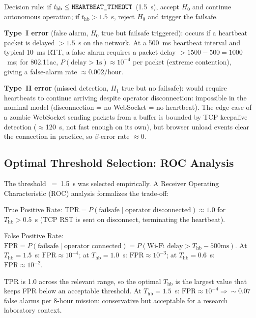 \begin{eqblock}
Decision rule: if $t_{\text{hb}}\leq\code{HEARTBEAT\_TIMEOUT}$ (1.5~s), accept $H_0$ and continue autonomous operation; if $t_{\text{hb}}>1.5$~s, reject $H_0$ and trigger the failsafe.

\textbf{Type~I error} (false alarm, $H_0$ true but failsafe triggered): occurs if a heartbeat packet is delayed $>1.5$~s on the network. At a 500~ms heartbeat interval and typical 10~ms RTT, a false alarm requires a packet delay $>1500-500=1000$~ms; for 802.11ac, $P(\text{delay}>1\text{s})\approx10^{-4}$ per packet (extreme contention), giving a false-alarm rate $\approx0.002$/hour.

\textbf{Type~II error} (missed detection, $H_1$ true but no failsafe): would require heartbeats to continue arriving despite operator disconnection: impossible in the nominal model (disconnection = no WebSocket = no heartbeat). The edge case of a zombie WebSocket sending packets from a buffer is bounded by TCP keepalive detection ($\approx$120~s, not fast enough on its own), but browser unload events clear the connection in practice, so $\beta$-error rate $\approx0$.
\end{eqblock}

\subsection{Optimal Threshold Selection: ROC Analysis}

The threshold ~=~1.5~s was selected empirically. A Receiver Operating Characteristic (ROC) analysis formalizes the trade-off:

\begin{eqblock}
True Positive Rate: $\text{TPR} = P(\text{failsafe}\mid\text{operator disconnected}) \approx 1.0$ for $T_{\text{hb}}>0.5$~s (TCP RST is sent on disconnect, terminating the heartbeat).

False Positive Rate: $\text{FPR} = P(\text{failsafe}\mid\text{operator connected}) = P(\text{Wi-Fi delay}>T_{\text{hb}}-500\text{ms})$. At $T_{\text{hb}}=1.5$~s: $\text{FPR}\approx10^{-4}$; at $T_{\text{hb}}=1.0$~s: $\text{FPR}\approx10^{-3}$; at $T_{\text{hb}}=0.6$~s: $\text{FPR}\approx10^{-2}$.

TPR is 1.0 across the relevant range, so the optimal $T_{\text{hb}}$ is the largest value that keeps FPR below an acceptable threshold. At $T_{\text{hb}}=1.5$~s: $\text{FPR}\approx10^{-4}\Rightarrow\sim$0.07 false alarms per 8-hour mission: conservative but acceptable for a research laboratory context.
\end{eqblock}

